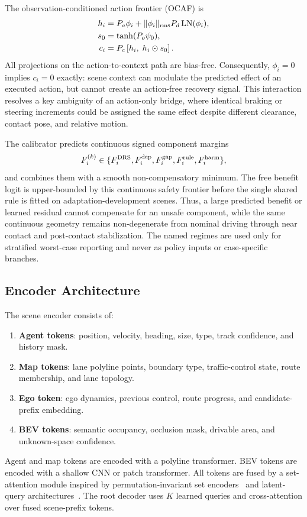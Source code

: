 \documentclass[conference]{IEEEtran}
\begin{document}
The observation-conditioned action frontier (OCAF) is
\begin{align}
h_i &= P_a\phi_i + \|\phi_i\|_{\rm rms}P_d\operatorname{LN}(\phi_i),\\
s_0 &= \tanh(P_o\psi_0),\\
c_i &= P_c\left[h_i,\;h_i\odot s_0\right].
\end{align}
All projections on the action-to-context path are bias-free.  Consequently, $\phi_i=0$ implies $c_i=0$ exactly: scene context can modulate the predicted effect of an executed action, but cannot create an action-free recovery signal.  This interaction resolves a key ambiguity of an action-only bridge, where identical braking or steering increments could be assigned the same effect despite different clearance, contact pose, and relative motion.

The calibrator predicts continuous signed component margins
\begin{equation}
F_i^{(k)}\in\{F_i^{\rm DRS},F_i^{\rm dep},F_i^{\rm gap},F_i^{\rm rule},F_i^{\rm harm}\},
\end{equation}
and combines them with a smooth non-compensatory minimum.  The free benefit logit is upper-bounded by this continuous safety frontier before the single shared rule is fitted on adaptation-development scenes.  Thus, a large predicted benefit or learned residual cannot compensate for an unsafe component, while the same continuous geometry remains non-degenerate from nominal driving through near contact and post-contact stabilization.  The named regimes are used only for stratified worst-case reporting and never as policy inputs or case-specific branches.

\subsection{Encoder Architecture}
\label{app:encoder}

The scene encoder consists of:
\begin{enumerate}[leftmargin=*]
    \item \textbf{Agent tokens}: position, velocity, heading, size, type, track confidence, and history mask.
    \item \textbf{Map tokens}: lane polyline points, boundary type, traffic-control state, route membership, and lane topology.
    \item \textbf{Ego token}: ego dynamics, previous control, route progress, and candidate-prefix embedding.
    \item \textbf{BEV tokens}: semantic occupancy, occlusion mask, drivable area, and unknown-space confidence.
\end{enumerate}
Agent and map tokens are encoded with a polyline transformer.  BEV tokens are encoded with a shallow CNN or patch transformer.  All tokens are fused by a set-attention module inspired by permutation-invariant set encoders~\cite{lee2019set} and latent-query architectures~\cite{jaegle2021perceiver}.  The root decoder uses $K$ learned queries and cross-attention over fused scene-prefix tokens.
\end{document}
